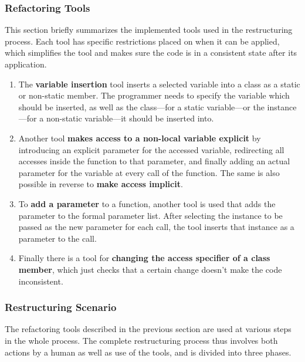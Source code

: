 \documentclass[conference,compsoc,a4paper]{IEEEtran}
\begin{document}
\subsubsection{Refactoring Tools}

This section briefly summarizes the implemented tools used in the restructuring process. Each tool has specific 
restrictions placed on when it can be applied, which simplifies the tool and makes sure the code is in a consistent 
state after its application.

\begin{enumerate}
  \item The \textbf{variable insertion} tool inserts a selected variable into a class as a static or non-static member. 
  The programmer needs to specify the variable which should be inserted, as well as the class---for a static 
  variable---or the instance---for a non-static variable---it should be inserted into.
  
  \item Another tool \textbf{makes access to a non-local variable explicit} by introducing an explicit parameter for 
  the accessed variable, redirecting all accesses inside the function to that parameter, and finally adding an actual 
  parameter for the variable at every call of the function. The same is also possible in reverse to \textbf{make access 
  implicit}.
  
  \item To \textbf{add a parameter} to a function, another tool is used that adds the parameter to the formal parameter 
  list. After selecting the instance to be passed as the new parameter for each call, the tool inserts that instance as 
  a parameter to the call.
  
  \item Finally there is a tool for \textbf{changing the access specifier of a class member}, which just checks that a 
  certain change doesn't make the code inconsistent.
\end{enumerate}

\subsubsection{Restructuring Scenario}

The refactoring tools described in the previous section are used at various steps in the whole process. The complete 
restructuring process thus involves both actions by a human as well as use of the tools, and is divided into three 
phases.
\end{document}
